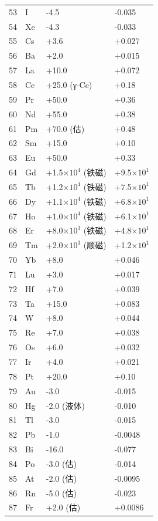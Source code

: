 \documentclass[12pt,a4paper]{article}
\begin{document}
\begin{longtable}{p{0.6cm}p{1.2cm}p{2.5cm}p{2.5cm}}
		53 & I  & -4.5 & -0.035 \\
		54 & Xe & -4.3 & -0.033 \\
		55 & Cs & +3.6 & +0.027 \\
		56 & Ba & +2.0 & +0.015 \\
		57 & La & +10.0 & +0.072 \\
		58 & Ce & +25.0 (γ-Ce) & +0.18 \\
		59 & Pr & +50.0 & +0.36 \\
		60 & Nd & +55.0 & +0.38 \\
		61 & Pm & +70.0 (估) & +0.48 \\
		62 & Sm & +15.0 & +0.10 \\
		63 & Eu & +50.0 & +0.33 \\
		64 & Gd & +1.5\(\times10^4\) (铁磁) & +9.5\(\times10^1\) \\
		65 & Tb & +1.2\(\times10^4\) (铁磁) & +7.5\(\times10^1\) \\
		66 & Dy & +1.1\(\times10^4\) (铁磁) & +6.8\(\times10^1\) \\
		67 & Ho & +1.0\(\times10^4\) (铁磁) & +6.1\(\times10^1\) \\
		68 & Er & +8.0\(\times10^3\) (铁磁) & +4.8\(\times10^1\) \\
		69 & Tm & +2.0\(\times10^3\) (顺磁) & +1.2\(\times10^1\) \\
		70 & Yb & +8.0 & +0.046 \\
		71 & Lu & +3.0 & +0.017 \\
		72 & Hf & +7.0 & +0.039 \\
		73 & Ta & +15.0 & +0.083 \\
		74 & W  & +8.0 & +0.044 \\
		75 & Re & +7.0 & +0.038 \\
		76 & Os & +6.0 & +0.032 \\
		77 & Ir & +4.0 & +0.021 \\
		78 & Pt & +20.0 & +0.10 \\
		79 & Au & -3.0 & -0.015 \\
		80 & Hg & -2.0 (液体) & -0.010 \\
		81 & Tl & -3.0 & -0.015 \\
		82 & Pb & -1.0 & -0.0048 \\
		83 & Bi & -16.0 & -0.077 \\
		84 & Po & -3.0 (估) & -0.014 \\
		85 & At & -2.0 (估) & -0.0095 \\
		86 & Rn & -5.0 (估) & -0.023 \\
		87 & Fr & +2.0 (估) & +0.0086 \\

\end{longtable}
\end{document}
